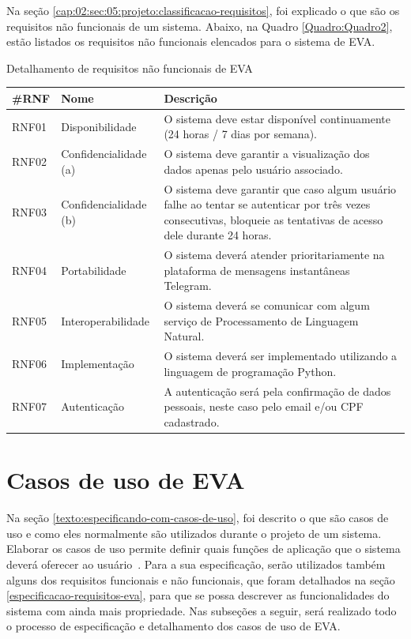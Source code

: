 Na seção \ref{cap:02:sec:05:projeto:classificacao-requisitos}, foi explicado o que são os requisitos não funcionais de um sistema. 
Abaixo, na Quadro \ref{Quadro:Quadro2}, estão listados os requisitos não funcionais elencados para o sistema de EVA.

\begin{quadro}[htb!]
\caption{Detalhamento de requisitos não funcionais de EVA}
\label{Quadro:Quadro2}
\begin{tabular}{|p{1.2cm}|p{3.5cm}|p{7.5cm}|}
  \hline
   \textbf{\#RNF} & \textbf{Nome}  & \textbf{Descrição}  \\
   \hline
    RNF01 & Disponibilidade & O sistema deve estar disponível continuamente (24 horas / 7 dias por semana). \\
   \hline
    RNF02 & Confidencialidade (a) & O sistema deve garantir a visualização dos dados apenas pelo usuário associado. \\
   \hline
    RNF03 & Confidencialidade (b) & O sistema deve garantir que caso algum usuário falhe ao tentar se autenticar por três vezes consecutivas, bloqueie as tentativas de acesso dele durante 24 horas. \\
   \hline
   RNF04 & Portabilidade & O sistema deverá atender prioritariamente na plataforma de mensagens instantâneas Telegram. \\
   \hline
    RNF05 & Interoperabilidade & O sistema deverá se comunicar com algum serviço de Processamento de Linguagem Natural. \\
   \hline
    RNF06 & Implementação & O sistema deverá ser implementado utilizando a linguagem de programação Python. \\
   \hline
    RNF07 & Autenticação & A autenticação será pela confirmação de dados pessoais, neste caso pelo email e/ou CPF cadastrado. \\
   \hline
\end{tabular}
\mfonte
\end{quadro}\label{Quadro:3}

\section{Casos de uso de EVA}\label{casos-de-uso-eva}

Na seção \ref{texto:especificando-com-casos-de-uso}, foi descrito o que são casos de uso e como eles normalmente são utilizados durante o projeto de um sistema. 
Elaborar os casos de uso permite definir quais funções de aplicação que o sistema deverá oferecer ao usuário~\cite{ReqJair}. 
Para a sua especificação, serão utilizados também alguns dos requisitos funcionais e não funcionais, que foram detalhados na seção \ref{especificacao-requisitos-eva}, para que se possa descrever as funcionalidades do sistema com ainda mais propriedade. 
Nas subseções a seguir, será realizado todo o processo de especificação e detalhamento dos casos de uso de EVA.

